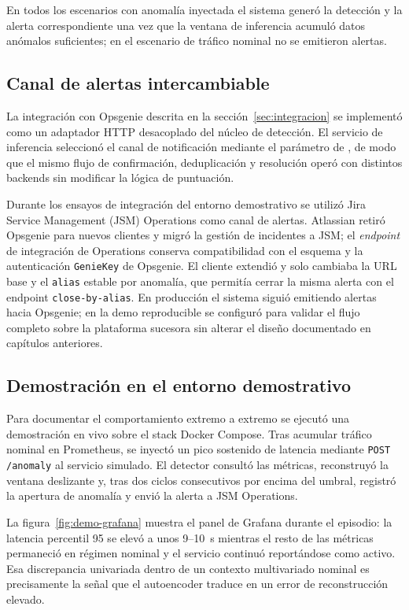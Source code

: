 En todos los escenarios con anomalía inyectada el sistema generó la detección y la alerta correspondiente una vez que la ventana de inferencia acumuló datos anómalos suficientes; en el escenario de tráfico nominal no se emitieron alertas.

\subsection{Canal de alertas intercambiable}

La integración con Opsgenie descrita en la sección~\ref{sec:integracion} se implementó como un adaptador HTTP desacoplado del núcleo de detección. El servicio de inferencia seleccionó el canal de notificación mediante el parámetro  de , de modo que el mismo flujo de confirmación, deduplicación y resolución operó con distintos backends sin modificar la lógica de puntuación.

Durante los ensayos de integración del entorno demostrativo se utilizó Jira Service Management (JSM) Operations como canal de alertas. Atlassian retiró Opsgenie para nuevos clientes y migró la gestión de incidentes a JSM; el \textit{endpoint} de integración de Operations conserva compatibilidad con el esquema y la autenticación \texttt{GenieKey} de Opsgenie. El cliente  extendió  y solo cambiaba la URL base y el \texttt{alias} estable por anomalía, que permitía cerrar la misma alerta con el endpoint \texttt{close-by-alias}. En producción el sistema siguió emitiendo alertas hacia Opsgenie; en la demo reproducible se configuró  para validar el flujo completo sobre la plataforma sucesora sin alterar el diseño documentado en capítulos anteriores.

\subsection{Demostración en el entorno demostrativo}

Para documentar el comportamiento extremo a extremo se ejecutó una demostración en vivo sobre el stack Docker Compose. Tras acumular tráfico nominal en Prometheus, se inyectó un pico sostenido de latencia mediante \texttt{POST /anomaly} al servicio simulado. El detector consultó las métricas, reconstruyó la ventana deslizante y, tras dos ciclos consecutivos por encima del umbral, registró la apertura de anomalía y envió la alerta a JSM Operations.

La figura~\ref{fig:demo-grafana} muestra el panel de Grafana durante el episodio: la latencia percentil 95 se elevó a unos 9--10~s mientras el resto de las métricas permaneció en régimen nominal y el servicio continuó reportándose como activo. Esa discrepancia univariada dentro de un contexto multivariado nominal es precisamente la señal que el autoencoder traduce en un error de reconstrucción elevado.

